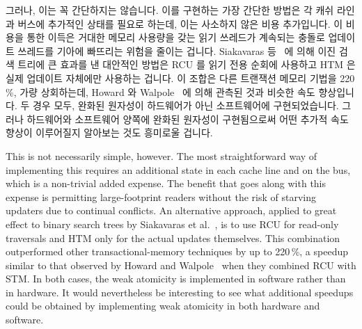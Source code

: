 \iffalse

Given that HTM is likely to face some sort of size limitations for the
foreseeable future, it will be necessary for HTM to interoperate
smoothly with other mechanisms.
HTM's interoperability with read-mostly mechanisms such as hazard pointers
and RCU would be improved if extra-transactional reads did not
unconditionally abort transactions with conflicting writes---instead,
the read could simply be provided with the pre-transaction value.
In this way, hazard pointers and RCU could be used to allow HTM to handle
larger data structures and to reduce conflict probabilities.

\fi

그러나, 이는 꼭 간단하지는 않습니다.
이를 구현하는 가장 간단한 방법은 각 캐쉬 라인과 버스에 추가적인 상태를 필요로
하는데, 이는 사소하지 않은 비용 추가입니다.
이 비용을 통한 이득은 거대한 메모리 사용량을 갖는 읽기 쓰레드가 계속되는 충돌로
업데이트 쓰레드를 기아에 빠뜨리는 위험을 줄이는 겁니다.
Siakavaras 등~\cite{Siakavaras2017CombiningHA} 에 의해 이진 검색 트리에 큰
효과를 낸 대안적인 방법은 RCU 를 읽기 전용 순회에 사용하고 HTM 은 실제 업데이트
자체에만 사용하는 겁니다.
이 조합은 다른 트랜잭션 메모리 기법을 220\,\%, 가량 상회하는데, Howard 와
Walpole~\cite{PhilHoward2011RCUTMRBTree} 에 의해 관측된 것과 비슷한 속도
향상입니다.
두 경우 모두, 완화된 원자성이 하드웨어가 아닌 소프트웨어에 구현되었습니다.
그러나 하드웨어와 소프트웨어 양쪽에 완화된 원자성이 구현됨으로써 어떤 추가적
속도 향상이 이루어질지 알아보는 것도 흥미로울 겁니다.

\iffalse

This is not necessarily simple, however.
The most straightforward way of implementing this requires an additional
state in each cache line and on the bus, which is a non-trivial added
expense.
The benefit that goes along with this expense is permitting
large-footprint readers without the risk of starving updaters due
to continual conflicts.
An alternative approach, applied to great effect to binary search trees
by Siakavaras et al.~\cite{Siakavaras2017CombiningHA},
is to use RCU for read-only traversals and HTM
only for the actual updates themselves.
This combination outperformed other transactional-memory techniques by
up to 220\,\%, a speedup similar to that observed by
Howard and Walpole~\cite{PhilHoward2011RCUTMRBTree}
when they combined RCU with STM\@.
In both cases, the weak atomicity is implemented in software rather than
in hardware.
It would nevertheless be interesting to see what additional speedups
could be obtained by implementing weak atomicity in both hardware and
software.


